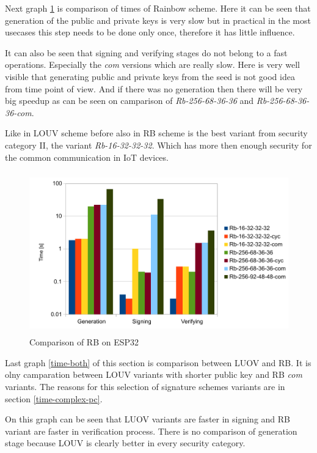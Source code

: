 \documentclass[thesis=M,english]{FITthesis}[2019/12/23]
\begin{document}
Next graph \ref{time-rb} is comparison of times of Rainbow scheme. Here it can be seen that generation of the public and private keys is very slow but in practical in the most usecases this step needs to be done only once, therefore it has little influence.

\bigskip
\noindent
It can also be seen that signing and verifying stages do not belong to a fast operations. Especially the \textit{com} versions which are really slow. Here is very well visible that generating public and private keys from the seed is not good idea from time point of view. And if there was no generation then there will be very big speedup as can be seen on camparison of \textit{Rb-256-68-36-36} and \textit{Rb-256-68-36-36-com}.

\bigskip
\noindent
Like in LOUV scheme before also in RB scheme is the best variant from security category II, the variant \textit{Rb-16-32-32-32}. Which has more then enough security for the common communication in IoT devices.

\begin{figure}[H]
\centering
\includegraphics[width=13cm,height=7cm]{images/time-rb.pdf}
\caption{Comparison of RB on ESP32}
\label{time-rb}
\end{figure}

\noindent
Last graph \ref{time-both} of this section is comparison between LUOV and RB. It is olny camparation between LOUV variants with shorter public key and RB \textit{com} variants. The reasons for this selection of signature schemes variants are in section \ref{time-complex-pc}.

\bigskip
\noindent
On this graph can be seen that LUOV variants are faster in signing and RB variant are faster in verification process. There is no comparison of generation stage because LOUV is clearly better in every security category.
\end{document}
